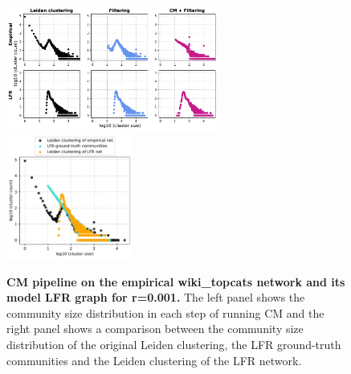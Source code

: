 \documentclass[a4paper]{article}   	%
\begin{document}
\begin{figure}[h!]
\centering
\includegraphics[width=0.62\textwidth]{figs/wiki_topcats_cm_steps_lfr001.pdf}
\includegraphics[width=0.37\textwidth]{figs/wiki_topcats_001_cm_size.pdf}
\caption[CM pipeline on the wiki\_topcats  network and its model LFR graph for r=0.001]{\textbf{CM pipeline on the empirical wiki\_topcats network and its model LFR graph for r=0.001.} The left panel shows the community size distribution in each step of running CM and the right panel shows a comparison between the community size distribution of the original Leiden clustering, the LFR ground-truth communities and the Leiden clustering of the LFR network.}
\label{fig:wikitopcats-cm-lfr-001}
\end{figure}
\end{document}
